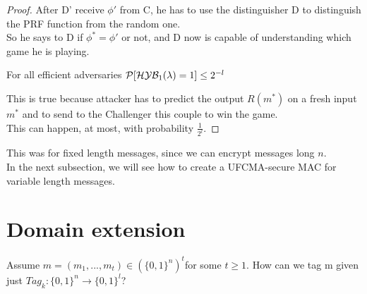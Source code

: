 \begin{proof}
After D' receive $\phi'$ from C, he has to use the distinguisher D to distinguish the PRF
function from the random one.\\
So he says to D if $\phi^{*}=\phi'$ or not, and D now is capable of
understanding which game he is playing.

\begin{lemma}
    For all efficient adversaries $ \mathcal{P} [ \mathcal{H}\mathcal{Y}\mathcal{B}_{1}(\lambda)=1 ] \leq 2^{-l}  $
\end{lemma}
This is true because attacker has to predict the output $R(m^{*})$ on a fresh
input $m^{*}$ and to send to the Challenger this couple to win the game.\\
This can happen, at most, with probability $\frac{1}{2^{l}}$.
\end{proof}

This was for fixed length messages, since we can encrypt messages long $n$.\\
In the next subsection, we will see how to create a UFCMA-secure MAC for
variable length messages.

\section{Domain extension}
Assume $m=(m_{1}, ..., m_{t}) \in (\{0,1\}^{n})^{t}$for some $t \geq 1$. How can we tag m given just $Tag_{k}:\{0,1\}^{n} \to \{0,1\}^{l} $?

